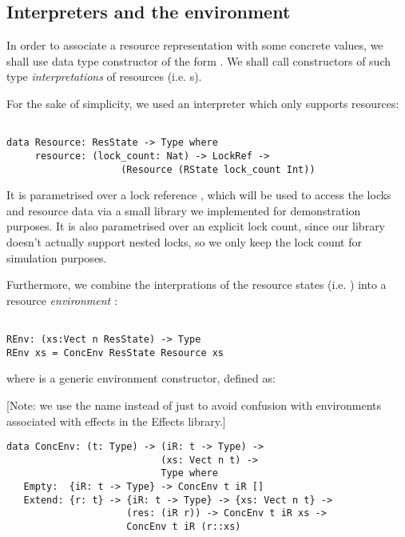 \subsection{Interpreters and the environment}

In order to associate a  resource representation with some
concrete values, we shall use data type constructor of the form
. We shall call constructors of such type
\emph{interpretations} of resources (i.e. s).

For the sake of simplicity, we used an interpreter which only
supports  resources:

\begin{BVerbatim}

data Resource: ResState -> Type where
     resource: (lock_count: Nat) -> LockRef ->
                    (Resource (RState lock_count Int))

\end{BVerbatim}

It is parametrised over a lock reference , which will be used to
access the locks and resource data via a small library we implemented for
demonstration purposes. It is also parametrised over an explicit lock count,
since our library doesn't actually support nested locks, so we only keep the
lock count for simulation purposes.

Furthermore, we combine the interprations of the resource states (i.e.
) into a resource \emph{environment} :

\begin{BVerbatim}

REnv: (xs:Vect n ResState) -> Type
REnv xs = ConcEnv ResState Resource xs

\end{BVerbatim}

where  is a generic environment constructor, defined as:

[Note: we use the name  instead of just  to avoid
confusion with environments associated with effects in the Effects library.]

\begin{BVerbatim}
data ConcEnv: (t: Type) -> (iR: t -> Type) ->
                           (xs: Vect n t) ->
                           Type where
   Empty:  {iR: t -> Type} -> ConcEnv t iR []
   Extend: {r: t} -> {iR: t -> Type} -> {xs: Vect n t} ->
                     (res: (iR r)) -> ConcEnv t iR xs ->
                     ConcEnv t iR (r::xs)
\end{BVerbatim}

